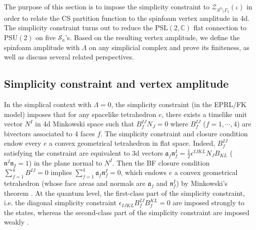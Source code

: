 \documentclass[aps,prd,notitlepage,nofootinbib,superscriptaddress,groupedaddress,twocolumn]{revtex4-1}
\newcommand{\PSlc}{\mathrm{PSL}(2,\mathbb{C})}
\newcommand{\PSu}{\mathrm{PSU}(2)}
\newcommand{\cs}{\mathcal S}
\newcommand{\cz}{\mathcal Z}
\newcommand{\fa}{\mathfrak{a}}  \newcommand{\Fa}{\mathfrak{A}}
\newcommand{\fn}{\mathfrak{n}}  \newcommand{\Fn}{\mathfrak{N}}
\newcommand{\G}{\Gamma}
\renewcommand{\L }{\Lambda}
\begin{document}
The purpose of this section is to impose the simplicity constraint to $\cz_{S^3\setminus\G_5}(\iota)$ in order to relate the CS partition function to the spinfoam vertex amplitude in 4d. The simplicity constraint turns out to reduce the $\PSlc$ flat connection to $\PSu$ on five $\cs_a$'s. Based on the resulting vertex amplitude, we define the spinfoam amplitude with $\L$ on any simplicial complex and prove its finiteness, as well as discuss several related perspectives.  



\subsection{Simplicity constraint and vertex amplitude}


In the simplical context with $\L=0$, the simplicity constraint (in the EPRL/FK model) imposes that for any spacelike tetrahedron $e$, there exists a timelike unit vector $N^I$ in 4d Minkowski space such that $B^{IJ}_fN_J=0$ where $B^{IJ}_f$ ($f=1,\cdots,4$) are bivectors associated to 4 faces $f$. The simplicity constraint and closure condition endow every $e$ a convex geometrical tetrahedron in flat space. Indeed, $B_f^{IJ}$ satisfying the constraint are equivalent to 3d vectors $\fa_f{\fn}^I_f=\frac{1}{2}\epsilon^{IJKL}N_J B_{KL}$ ($\fn^I\fn_I=1$) in the plane normal to $N^I$. Then the BF closure condition $\sum_{f=1}^4B^{IJ}=0$ implies $\sum_{f=1}^4\fa_f{\fn}^I_f=0$, which endows $e$ a convex geometrical tetrahedron (whose face areas and normals are $\fa_f$ and ${\fn}_f^I$) by Minkowski's theorem \cite{Minkowski}. At the quantum level, the first-class part of the simplicity constraint, i.e. the diagonal simplicity constraint $\epsilon_{IJKL}B_f^{IJ}B_f^{KL}=0$ are imposed strongly to the states, whereas the second-class part of the simplicity constraint are imposed weakly \cite{EPRL,FK,generalize}.
\end{document}

